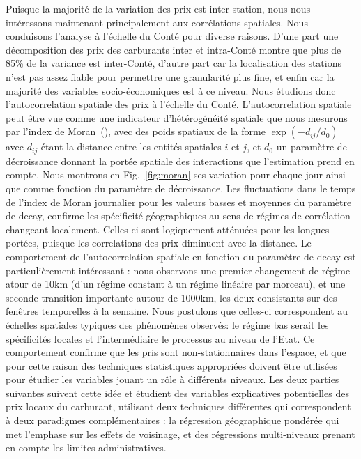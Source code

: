 {Puisque la majorité de la variation des prix est inter-station, nous nous intéressons maintenant principalement aux corrélations spatiales. Nous conduisons l'analyse à l'échelle du Conté pour diverse raisons. D'une part une décomposition des prix des carburants inter et intra-Conté montre que plus de 85\% de la variance est inter-Conté, d'autre part car la localisation des stations n'est pas assez fiable pour permettre une granularité plus fine, et enfin car la majorité des variables socio-économiques est à ce niveau. Nous étudions donc l'autocorrelation spatiale des prix à l'échelle du Conté. L'autocorrelation spatiale peut être vue comme une indicateur d'hétérogénéité spatiale que nous mesurons par l'index de Moran~(\cite{tsai2005quantifying}), avec des poids spatiaux de la forme $\exp{\left(-d_{ij} / d_0 \right)}$ avec  $d_{ij}$ étant la distance entre les entités spatiales $i$ et $j$, et $d_0$ un paramètre de décroissance donnant la portée spatiale des interactions que l'estimation prend en compte. Nous montrons en Fig.~\ref{fig:moran} ses variation pour chaque jour ainsi que comme fonction du paramètre de décroissance.
Les fluctuations dans le temps de l'index de Moran journalier pour les valeurs basses et moyennes du paramètre de decay, confirme les spécificité géographiques au sens de régimes de corrélation changeant localement. Celles-ci sont logiquement atténuées pour les longues portées, puisque les correlations des prix diminuent avec la distance. Le comportement de l'autocorrelation spatiale en fonction du paramètre de decay est particulièrement intéressant : nous observons une premier changement de régime atour de 10km (d'un régime constant à un régime linéaire par morceau), et une seconde transition importante autour de 1000km, les deux consistants sur des fenêtres temporelles à la semaine. Nous postulons que celles-ci correspondent au échelles spatiales typiques des phénomènes observés: le régime bas serait les spécificités locales et l'intermédiaire le processus au niveau de l'Etat. Ce comportement confirme que les pris sont non-stationnaires dans l'espace, et que pour cette raison des techniques statistiques appropriées doivent être utilisées pour étudier les variables jouant un rôle à différents niveaux. Les deux parties suivantes suivent cette idée et étudient des variables explicatives potentielles des prix locaux du carburant, utilisant deux techniques différentes qui correspondent à deux paradigmes complémentaires : la régression géographique pondérée qui met l'emphase sur les effets de voisinage, et des régressions multi-niveaux prenant en compte les limites administratives.
}


